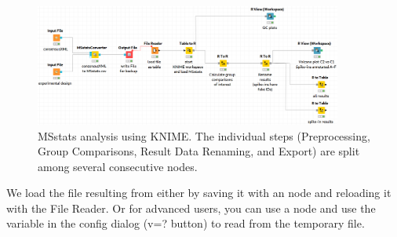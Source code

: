 \begin{figure}[htbp]
	\centering
	\includegraphics[width=0.9\textwidth]{graphics/labelfree/msstats/MSstats.png}
	\caption{MSstats analysis using KNIME. The individual steps (Preprocessing,
	Group Comparisons, Result Data Renaming, and Export) are split among several consecutive nodes.}
	\label{fig:msstats_workflow}
\end{figure}

\noindent We load the file resulting from  either by saving it with an  node and reloading it with the File Reader. Or for advanced users,
you can use a  node and use the variable in the  config dialog (v=? button) to read from the temporary file.

